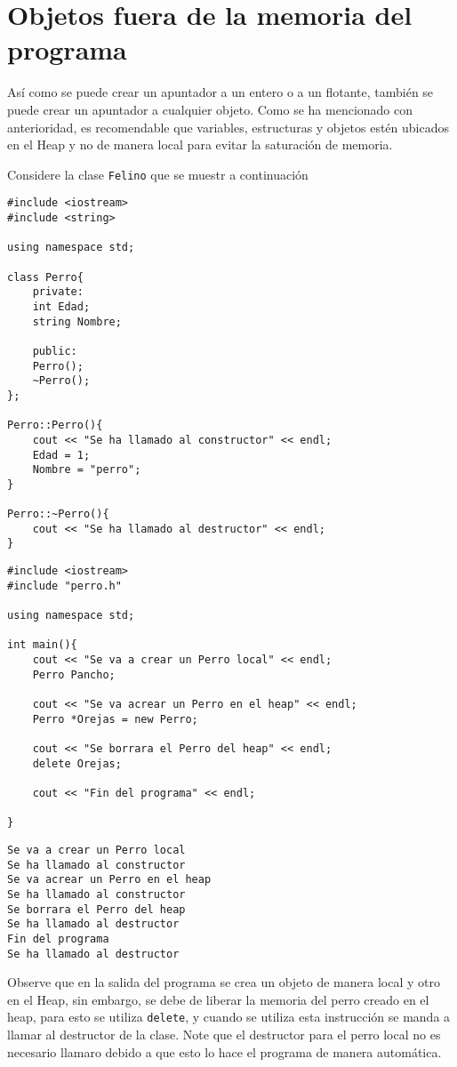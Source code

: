 \documentclass[12pt]{extarticle}
\newcommand{\<}{\langle}
\renewcommand{\>}{\rangle}
\theoremstyle{definition}
\begin{document}
\section{Objetos fuera de la memoria del programa}

Así como se puede crear un apuntador a un entero o a un flotante, también se puede crear un apuntador a cualquier objeto. Como se ha mencionado con anterioridad, es recomendable que variables, estructuras y objetos estén ubicados en el Heap y no de manera local para evitar la saturación de memoria. 

Considere la clase \verb|Felino| que se muestr a continuación

\begin{lstlisting}
#include <iostream>
#include <string>

using namespace std;

class Perro{
	private:
	int Edad;
	string Nombre;
	
	public:
	Perro();
	~Perro();
};

Perro::Perro(){
	cout << "Se ha llamado al constructor" << endl;
	Edad = 1;
	Nombre = "perro";
}

Perro::~Perro(){
	cout << "Se ha llamado al destructor" << endl; 
}
\end{lstlisting}


\begin{lstlisting}
#include <iostream>
#include "perro.h"

using namespace std;

int main(){
	cout << "Se va a crear un Perro local" << endl; 
	Perro Pancho;
	
	cout << "Se va acrear un Perro en el heap" << endl; 
	Perro *Orejas = new Perro;
	
	cout << "Se borrara el Perro del heap" << endl; 
	delete Orejas;
	
	cout << "Fin del programa" << endl;
	
}
\end{lstlisting}


\begin{lstlisting}
Se va a crear un Perro local
Se ha llamado al constructor
Se va acrear un Perro en el heap
Se ha llamado al constructor
Se borrara el Perro del heap
Se ha llamado al destructor
Fin del programa
Se ha llamado al destructor
\end{lstlisting}

Observe que en la salida del programa se crea un objeto de manera local y otro en el Heap, sin embargo, se debe de liberar la memoria del perro creado en el heap, para esto se utiliza \verb|delete|, y cuando se utiliza esta instrucción se manda a llamar al destructor de la clase. Note que el destructor para el perro local no es necesario llamaro debido a que esto lo hace el programa de manera automática. 
\end{document}
